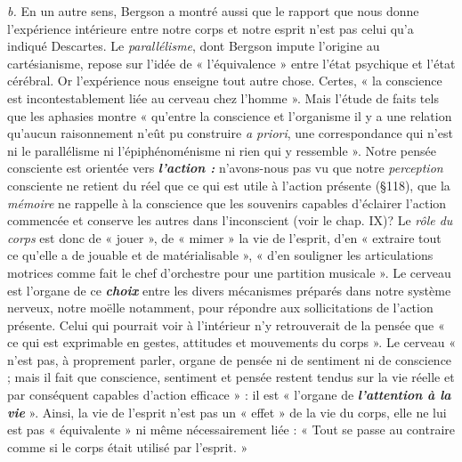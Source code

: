 {\it b.} En un autre sens, Bergson a montré aussi que le rapport que
nous donne l'expérience intérieure entre notre corps et notre esprit
n’est pas celui qu’a indiqué Descartes. Le {\it parallélisme}, dont Bergson
impute l’origine au cartésianisme, repose sur l’idée de « l’équivalence »
entre l’état psychique et l’état cérébral. Or l'expérience nous enseigne
tout autre chose. Certes, « la conscience est incontestablement liée au
cerveau chez l’homme ». Mais l’étude de faits tels que les aphasies
montre « qu’entre la conscience et l'organisme il y a une relation
qu’aucun raisonnement n’eût pu construire {\it a priori}, une correspondance
qui n’est ni le parallélisme ni l’épiphénoménisme ni rien qui y
ressemble ». Notre pensée consciente est orientée vers \textbf{\textit {l’action :}}
n’avons-nous pas vu que notre {\it perception} consciente ne retient du
réel que ce qui est utile à l’action présente (\S 118), que la {\it mémoire}
ne rappelle à la conscience que les souvenirs capables d'éclairer
l’action commencée et conserve les autres dans l’inconscient (voir le
chap. IX)? Le {\it rôle du corps} est donc de « jouer », de « mimer » la vie
de l'esprit, d’en « extraire tout ce qu’elle a de jouable et de matérialisable »,
« d’en souligner les articulations motrices comme fait le
chef d’orchestre pour une partition musicale ». Le cerveau est l’organe
de ce \textbf{\textit {choix}} entre les divers mécanismes préparés dans notre système
nerveux, notre moëlle notamment, pour répondre aux sollicitations
de l’action présente. Celui qui pourrait voir à l’intérieur n’y retrouverait
de la pensée que « ce qui est exprimable en gestes, attitudes et
mouvements du corps ». Le cerveau « n’est pas, à proprement parler,
organe de pensée ni de sentiment ni de conscience ; mais il fait que
conscience, sentiment et pensée restent tendus sur la vie réelle et
par conséquent capables d'action efficace » : il est « l’organe de
\textbf{\textit {l'attention à la vie}} ». Ainsi, la vie de l'esprit n’est pas un « effet »
de la vie du corps, elle ne lui est pas « équivalente » ni même nécessairement
liée : « Tout se passe au contraire comme si le corps était utilisé
par l'esprit. »

